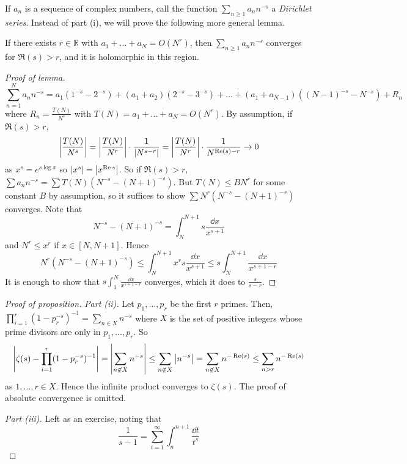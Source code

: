 If \( a_n \) is a sequence of complex numbers, call the function \( \sum_{n \geq 1} a_n n^{-s} \) a \emph{Dirichlet series}.
Instead of part (i), we will prove the following more general lemma.
\begin{lemma}
    If there exists \( r \in \mathbb R \) with \( a_1 + \dots + a_N = O(N^r) \), then \( \sum_{n \geq 1} a_n n^{-s} \) converges for \( \Re(s) > r \), and it is holomorphic in this region.
\end{lemma}
\begin{proof}[Proof of lemma]
    \[ \sum_{n=1}^N a_n n^{-s} = a_1 (1^{-s} - 2^{-s}) + (a_1 + a_2) (2^{-s} - 3^{-s}) + \dots + (a_1 + a_{N-1})((N-1)^{-s} - N^{-s}) + R_n \]
    where \( R_n = \frac{T(N)}{N^s} \) with \( T(N) = a_1 + \dots + a_N = O(N^r) \).
    By assumption, if \( \Re(s) > r \),
    \[ \abs{\frac{T(N)}{N^s}} = \abs{\frac{T(N)}{N^r}} \cdot \frac{1}{\abs{N^{s-r}}} = \abs{\frac{T(N)}{N^r}} \cdot \frac{1}{N^{\Re(s) - r}} \to 0 \]
    as \( x^s = e^{s \log x} \) so \( \abs{x^s} = \abs{x^{\Re s}} \).
    So if \( \Re(s) > r \), \( \sum a_n n^{-s} = \sum T(N) (N^{-s} - (N+1)^{-s}) \).
    But \( T(N) \leq BN^r \) for some constant \( B \) by assumption, so it suffices to show \( \sum N^r (N^{-s} - (N+1)^{-s}) \) converges.
    Note that
    \[ N^{-s} - (N+1)^{-s} = \int_N^{N+1} s \frac{\dd{x}}{x^{s+1}} \]
    and \( N^r \leq x^r \) if \( x \in [N, N+1] \).
    Hence
    \[ N^r (N^{-s} - (N+1)^{-s}) \leq \int_N^{N+1} x^r s \frac{\dd{x}}{x^{s+1}} \leq s \int_N^{N+1} \frac{\dd{x}}{x^{s+1-r}} \]
    It is enough to show that \( s\int_1^N \frac{\dd{x}}{x^{s+1-r}} \) converges, which it does to \( \frac{s}{s-r} \).
\end{proof}
\begin{proof}[Proof of proposition]
    \emph{Part (ii).}
    Let \( p_1, \dots, p_r \) be the first \( r \) primes.
    Then, \( \prod_{i=1}^r (1 - p_r^{-s})^{-1} = \sum_{n \in X} n^{-s} \) where \( X \) is the set of positive integers whose prime divisors are only in \( p_1, \dots, p_r \).
    So
    \[ \abs{\zeta(s) - \prod_{i=1}^r (1 - p_r^{-s})^{-1}} = \abs{\sum_{n \not\in X} n^{-s}} \leq \sum_{n \not\in X} \abs{n^{-s}} = \sum_{n \not\in X} n^{-\Re(s)} \leq \sum_{n > r} n^{-\Re(s)} \]
    as \( 1, \dots, r \in X \).
    Hence the infinite product converges to \( \zeta(s) \).
    The proof of absolute convergence is omitted. 

    \emph{Part (iii).}
    Left as an exercise, noting that
    \[ \frac{1}{s-1} = \sum_{i=1}^\infty \int_n^{n+1} \frac{\dd{t}}{t^s} \]
\end{proof}

